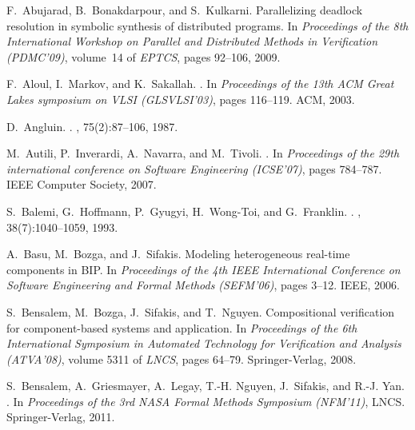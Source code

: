 \documentclass[10pt, a4paper, onecolumn, conference, compsocconf]{IEEEtran}
\begin{document}

\begin{thebibliography}{10}

F.~Abujarad, B.~Bonakdarpour, and S.~Kulkarni.
\newblock Parallelizing deadlock resolution in symbolic synthesis of
  distributed programs.
\newblock In {\em Proceedings of the 8th International Workshop on Parallel and
  Distributed Methods in Verification (PDMC'09)}, volume~14 of {\em EPTCS},
  pages 92--106, 2009.

F.~Aloul, I.~Markov, and K.~Sakallah.
.
\newblock In {\em Proceedings of the 13th ACM Great Lakes symposium on VLSI
  (GLSVLSI'03)}, pages 116--119. ACM, 2003.

D.~Angluin.
.
, 75(2):87--106, 1987.

M.~Autili, P.~Inverardi, A.~Navarra, and M.~Tivoli.
.
\newblock In {\em Proceedings of the 29th international conference on Software
  Engineering (ICSE'07)}, pages 784--787. IEEE Computer Society, 2007.

S.~Balemi, G.~Hoffmann, P.~Gyugyi, H.~Wong-Toi, and G.~Franklin.
.
, 38(7):1040--1059,
  1993.

A.~Basu, M.~Bozga, and J.~Sifakis.
\newblock Modeling heterogeneous real-time components in {BIP}.
\newblock In {\em Proceedings of the 4th IEEE International Conference on
  Software Engineering and Formal Methods (SEFM'06)}, pages 3--12. IEEE, 2006.

S.~Bensalem, M.~Bozga, J.~Sifakis, and T.~Nguyen.
\newblock Compositional verification for component-based systems and
  application.
\newblock In {\em Proceedings of the 6th International Symposium in Automated
  Technology for Verification and Analysis (ATVA'08)}, volume 5311 of {\em
  LNCS}, pages 64--79. Springer-Verlag, 2008.

S.~Bensalem, A.~Griesmayer, A.~Legay, T.-H. Nguyen, J.~Sifakis, and R.-J. Yan.
.
\newblock In {\em Proceedings of the 3rd NASA Formal Methods Symposium
  (NFM'11)}, LNCS. Springer-Verlag, 2011.


\end{thebibliography}
\end{document}
